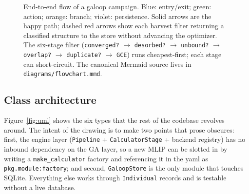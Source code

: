 \documentclass[11pt,letterpaper]{article}
\begin{document}
\begin{figure}[H]

\caption{End-to-end flow of a galoop campaign. Blue: entry/exit;
green: action; orange: branch; violet: persistence. Solid arrows are
the happy path; dashed red arrows show each harvest filter returning
a classified structure to the store without advancing the optimizer.
The six-stage filter (\texttt{converged?} $\to$ \texttt{desorbed?} $\to$
\texttt{unbound?} $\to$ \texttt{overlap?} $\to$ \texttt{duplicate?} $\to$
\texttt{GCE}) runs cheapest-first; each stage can short-circuit.
The canonical Mermaid source lives in \texttt{diagrams/flowchart.mmd}.}
\label{fig:flowchart}
\end{figure}

\subsection{Class architecture}

Figure~\ref{fig:uml} shows the six types that the rest of the codebase
revolves around. The intent of the drawing is to make two points that
prose obscures: first, the engine layer (\texttt{Pipeline} +
\texttt{CalculatorStage} + backend registry) has no inbound dependency
on the GA layer, so a new MLIP can be slotted in by writing a
\texttt{make\_calculator} factory and referencing it in the yaml as
\texttt{pkg.module:factory}; and second, \texttt{GaloopStore} is the
only module that touches SQLite. Everything else works through
\texttt{Individual} records and is testable without a live database.
\end{document}
